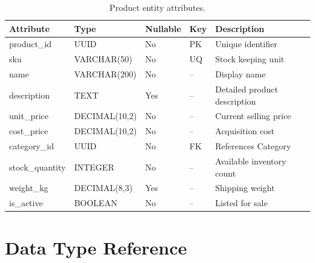 \documentclass[
    language=english,
    doctype=data-dictionary,
    institution=none,
]{../../omnilatex}
\begin{document}
\begin{table}[h]
    \centering
    \begin{tabular}{llllp{3.5cm}}
        \toprule
        \textbf{Attribute} & \textbf{Type} & \textbf{Nullable} & \textbf{Key} & \textbf{Description} \\
        \midrule
        product\_id & UUID & No & PK & Unique identifier \\
        sku & VARCHAR(50) & No & UQ & Stock keeping unit \\
        name & VARCHAR(200) & No & -- & Display name \\
        description & TEXT & Yes & -- & Detailed product description \\
        unit\_price & DECIMAL(10,2) & No & -- & Current selling price \\
        cost\_price & DECIMAL(10,2) & No & -- & Acquisition cost \\
        category\_id & UUID & No & FK & References Category \\
        stock\_quantity & INTEGER & No & -- & Available inventory count \\
        weight\_kg & DECIMAL(8,3) & Yes & -- & Shipping weight \\
        is\_active & BOOLEAN & No & -- & Listed for sale \\
        \bottomrule
    \end{tabular}
    \caption{Product entity attributes.}
\end{table}

\section{Data Type Reference}
\end{document}
